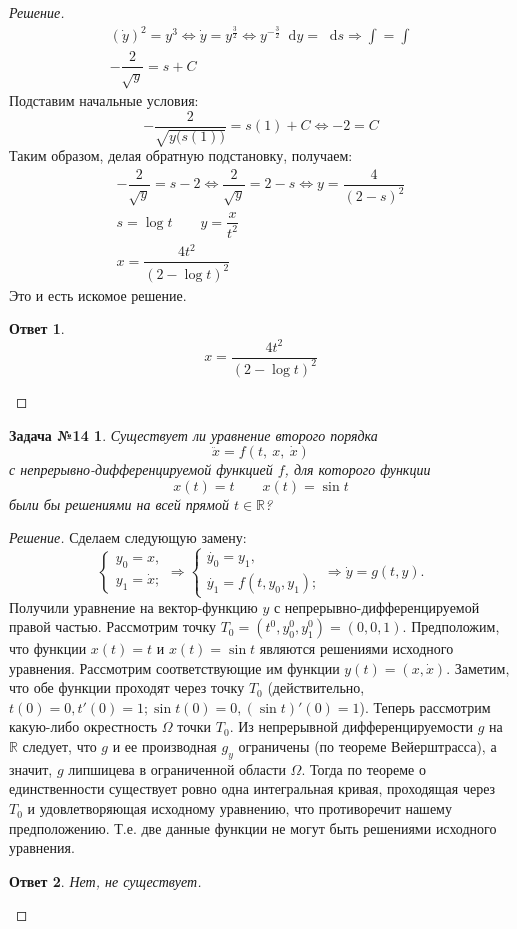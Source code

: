 \documentclass[a4paper,12pt]{article}
\newtheorem*{task14}{Задача №14}
\newtheorem*{ans}{Ответ}
\newcommand{\R}{\mathbb{R}}
\renewcommand*\d{\mathop{}\!\mathrm{d}}
\newcommand{\dy}{\dot{y}}
\newcommand{\dx}{\dot{x}}
\newcommand{\ddx}{\ddot{x}}
\newcommand{\bto}{\Longrightarrow}
\newcommand{\ds}{\displaystyle}
\begin{document}
\begin{proof}[Решение]
	\begin{gather*}
	(\dy)^2 = y^3 \iff \dy =  y^{\frac 32} \iff y^{-\frac 32}\d y = \d s \bto \ds\int = \int\\
	-\dfrac{2}{\sqrt{y}} = s + C
	\end{gather*}
	Подставим начальные условия:
	\[-\dfrac{2}{\sqrt{y\big(s(1)\big)}} = s(1) + C \iff -2 = C\]
	Таким образом, делая обратную подстановку, получаем:
	\begin{gather*}
	-\dfrac{2}{\sqrt{y}} = s - 2 \iff \dfrac{2}{\sqrt{y}} = 2 - s \iff y = \dfrac{4}{(2 - s)^2}\\
	s = \log t \qquad y = \dfrac{x}{t^2}\\
	x = \dfrac{4t^2}{(2 - \log t)^2}
	\end{gather*}
	Это и есть искомое решение.	
	\begin{ans}
		\[x = \dfrac{4t^2}{(2 - \log t)^2}\]
	\end{ans}
	
\end{proof}


\begin{task14}
	Существует ли уравнение второго порядка 
	\[\ddx = f(t,\ x,\ \dx)\]
	с непрерывно-дифференцируемой функцией $f$, для которого функции
	\[x(t) = t \qquad x(t) = \sin t\] были бы решениями на всей прямой $t \in \R$?
\end{task14}
\begin{proof}[Решение]
	Сделаем следующую замену:
	$$\begin{cases} y_0 = x, \\ y_1 = \dot{x}; \end{cases} \Rightarrow \begin{cases} \dot{y_0} = y_1, \\ \dot{y_1} = f(t, y_0, y_1); \end{cases} \Rightarrow \dot{y} = g(t, y).$$
	Получили уравнение на вектор-функцию $y$ с непрерывно-дифференцируемой правой частью.
	Рассмотрим точку $T_0 = (t^0, y_0^0, y_1^0) = (0, 0, 1)$. Предположим, что функции $x(t) = t$ и $x(t) = \sin{t}$ являются решениями исходного уравнения. Рассмотрим соответствующие им функции $y(t) = (x, \dot{x})$.
	Заметим, что обе функции проходят через точку $T_0$ (действительно, $t(0) = 0, t'(0) = 1; \sin{t}(0) = 0, (\sin{t})'(0) = 1$). Теперь рассмотрим какую-либо окрестность $\Omega$ точки $T_0$. Из непрерывной дифференцируемости $g$ на $\mathbb{R}$ следует, что $g$ и ее производная $g_y$ ограничены (по теореме Вейерштрасса), а значит, $g$ липшицева в ограниченной области $\Omega$. Тогда по теореме о единственности существует ровно одна интегральная кривая, проходящая через $T_0$ и удовлетворяющая исходному уравнению, что противоречит нашему предположению. Т.е. две данные функции не могут быть решениями исходного уравнения.
	
	\begin{ans}
		Нет, не существует.
	\end{ans}
\end{proof}
\end{document}
